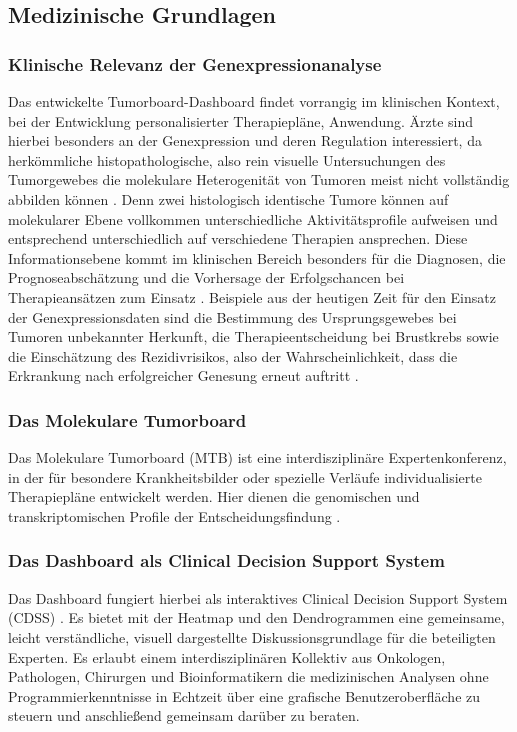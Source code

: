 \documentclass[12pt]{article}
\begin{document}
\subsection{Medizinische Grundlagen}
\label{medizin-grundlagen}

\subsubsection{Klinische Relevanz der Genexpressionanalyse}

Das entwickelte Tumorboard-Dashboard findet vorrangig im klinischen Kontext, bei der Entwicklung personalisierter Therapiepläne, Anwendung. Ärzte sind hierbei besonders an der Genexpression und deren Regulation interessiert, da herkömmliche histopathologische, also rein visuelle Untersuchungen des Tumorgewebes die molekulare Heterogenität von Tumoren meist nicht vollständig abbilden können \cite{Vogelstein2013}. Denn zwei histologisch identische Tumore können auf molekularer Ebene vollkommen unterschiedliche Aktivitätsprofile aufweisen und entsprechend unterschiedlich auf verschiedene Therapien ansprechen. Diese Informationsebene kommt im klinischen Bereich besonders für die Diagnosen, die Prognoseabschätzung und die Vorhersage der Erfolgschancen bei Therapieansätzen zum Einsatz \cite{NarrandesXu2018}. Beispiele aus der heutigen Zeit für den Einsatz der Genexpressionsdaten sind die Bestimmung des Ursprungsgewebes bei Tumoren unbekannter Herkunft, die Therapieentscheidung bei Brustkrebs sowie die Einschätzung des Rezidivrisikos, also der Wahrscheinlichkeit, dass die Erkrankung nach erfolgreicher Genesung erneut auftritt \cite{NarrandesXu2018}.

\subsubsection{Das Molekulare Tumorboard}

Das Molekulare Tumorboard (MTB) ist eine interdisziplinäre Expertenkonferenz, in der für besondere Krankheitsbilder oder spezielle Verläufe individualisierte Therapiepläne entwickelt werden. Hier dienen die genomischen und transkriptomischen Profile der Entscheidungsfindung \cite{Tamborero2020}.

\subsubsection{Das Dashboard als Clinical Decision Support System}

Das Dashboard fungiert hierbei als interaktives Clinical Decision Support System (CDSS) \cite{Tamborero2020}. Es bietet mit der Heatmap und den Dendrogrammen eine gemeinsame, leicht verständliche, visuell dargestellte Diskussionsgrundlage für die beteiligten Experten. Es erlaubt einem interdisziplinären Kollektiv aus Onkologen, Pathologen, Chirurgen und Bioinformatikern die medizinischen Analysen ohne Programmierkenntnisse in Echtzeit über eine grafische Benutzeroberfläche zu steuern und anschließend gemeinsam darüber zu beraten. 
\end{document}
